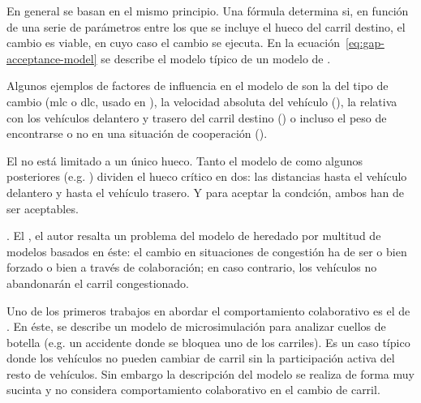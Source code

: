 En general se basan en el mismo principio. Una fórmula determina si, en función de una serie de parámetros entre los que se incluye el hueco del carril destino, el cambio es viable, en cuyo caso el cambio se ejecuta. En la ecuación~\ref{eq:gap-acceptance-model} se describe el modelo típico de un modelo de . 


Algunos ejemplos de factores de influencia en el modelo de \textit{} son la del tipo de cambio (\gls{mlc} o \gls{dlc}, usado en \cite{Ahmed1999, Toledo2007}), la velocidad absoluta del vehículo (\cite{Gipps1986, Ahmed1996}), la relativa con los vehículos delantero y trasero del carril destino (\cite{Ahmed1999}) o incluso el peso de encontrarse o no en una situación de cooperación (\cite{Ahmed1999, Hidas2002}).

El \textit{} no está limitado a un único hueco. Tanto el modelo de \cite{Gipps1986} como algunos posteriores (e.g. \cite{Ahmed1996}) dividen el hueco crítico en dos: las distancias hasta el vehículo delantero y hasta el vehículo trasero. Y para aceptar la condción, ambos han de ser aceptables.

. El \cite{Hidas2002}, el autor resalta un problema del modelo de \cite{Gipps1986} heredado por multitud de modelos basados en éste: el cambio en situaciones de congestión ha de ser o bien forzado o bien a través de colaboración; en caso contrario, los vehículos no abandonarán el carril congestionado.

Uno de los primeros trabajos en abordar el comportamiento colaborativo es el de \cite{Fritzsche1994}. En éste, se describe un modelo de microsimulación para analizar cuellos de botella (e.g. un accidente donde se bloquea uno de los carriles). Es un caso típico donde los vehículos no pueden cambiar de carril sin la participación activa del resto de vehículos. Sin embargo la descripción del modelo se realiza de forma muy sucinta y no considera comportamiento colaborativo en el cambio de carril.

